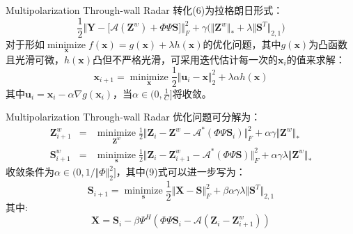 \documentclass[12pt]{beamer}
\begin{document}
\begin{frame}{Multipolarization Through-wall Radar}
  转化(6)为拉格朗日形式：
  \begin{equation}
	\frac{1}{2}\Big\Vert \mathbf{Y}-\big[\mathcal{A}(\mathbf{Z}^{w})+\Phi\Psi\mathbf{S}\big]\Big\Vert_{F}^2 +\gamma\big(\Vert \mathbf{Z}^{w}\Vert_{*}+\lambda\Vert \mathbf{S}^T\Vert_{2,1}\big) 
  \end{equation}
  对于形如$\mathop{\text{minimize}}\limits_{\mathbf x}f(\mathbf x)=g(\mathbf x)+\lambda h(\mathbf x)$的优化问题，其中$g(\mathbf x)$为凸函数且光滑可微，$h(\mathbf x)$凸但不严格光滑，可采用迭代估计每一次的$\mathbf x_i$的值来求解：
  \begin{equation*}
	\mathbf x_{i+1} = \mathop{\text{minimize}}\limits_{\mathbf x}\frac{1}{2}\Vert \mathbf u_i -\mathbf x \Vert _2^2+\lambda \alpha h(\mathbf x) 
  \end{equation*}
  其中$\mathbf u_i = \mathbf x_i -\alpha\nabla g(\mathbf x_i)$，当$\alpha\in\big(0,\frac{1}{C}\big]$将收敛。
\end{frame}
\begin{frame}{Multipolarization Through-wall Radar}
  优化问题可分解为：
  \begin{eqnarray}
  \mathbf{Z}_{i+1}^w&=&\mathop{\text{minimize}}\limits_{\mathbf{Z}^{w}}\frac{1}{2}\Big\Vert \mathbf{Z}_i-\mathbf{Z}^{w}-\mathcal{A}^*(\Phi\Psi\mathbf{S}_i)\Big\Vert_{F}^2 +\alpha\gamma\Vert\mathbf{Z}^{w}\Vert_{*}\\ 
	\mathbf{S}_{i+1}^w&=&\mathop{\text{minimize}}\limits_{\mathbf{s}}\frac{1}{2}\Big\Vert \mathbf{Z}_{i}-\mathbf{Z}^{w}_{i+1}-\mathcal{A}^*(\Phi\Psi\mathbf{S})\Big\Vert_{F}^2 +\alpha\gamma\lambda\Vert\mathbf{Z}^{w}\Vert_{*} 
  \end{eqnarray}
收敛条件为$\alpha\in\big(0,1/\Vert \Phi \Vert_2^2\big]$，其中(9)式可以进一步写为：
\begin{equation}
  \mathbf{S}_{i+1} = \mathop{\text{minimize}}\limits_{\mathbf{s}} \frac{1}{2}\Vert \mathbf{X}-\mathbf{S}\Vert_F^2+\beta\alpha\gamma\lambda\Vert\mathbf{S}^T\Vert_{2,1}
\end{equation}
其中:
\begin{equation*}
  \mathbf{X}=\mathbf S_i -\beta \Psi^H( \Phi \Psi\mathbf S_i-\mathcal A(\mathbf Z_i-\mathbf Z_{i+1}^w))
\end{equation*}
\end{frame}
\end{document}
